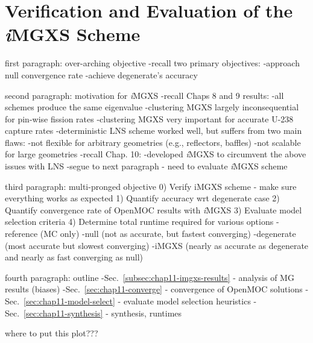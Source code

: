 \chapter{Verification and Evaluation of the \textit{i}MGXS Scheme}
\label{chap:results}

first paragraph: over-arching objective
-recall two primary objectives:
  -approach null convergence rate
  -achieve degenerate's accuracy

second paragraph: motivation for \textit{i}\ac{MGXS}
-recall Chaps 8 and 9 results:
  -all schemes produce the same eigenvalue
  -clustering MGXS largely inconsequential for pin-wise fission rates
  -clustering MGXS very important for accurate U-238 capture rates
  -deterministic LNS scheme worked well, but suffers from two main flaws:
    -not flexible for arbitrary geometries (e.g., reflectors, baffles)
    -not scalable for large geometries
-recall Chap. 10:
  -developed \textit{i}\ac{MGXS} to circumvent the above issues with LNS
-segue to next paragraph - need to evaluate \textit{i}\ac{MGXS} scheme

third paragraph: multi-pronged objective
0) Verify iMGXS scheme - make sure everything works as expected
1) Quantify accuracy wrt degenerate case
2) Quantify convergence rate of OpenMOC results with \textit{i}\ac{MGXS} 
3) Evaluate model selection criteria
4) Determine total runtime required for various options
   -reference (MC only)
   -null (not as accurate, but fastest converging)
   -degenerate (most accurate but slowest converging)
   -iMGXS (nearly as accurate as degenerate and nearly as fast converging as null)

fourth paragraph: outline
-Sec.~\ref{subsec:chap11-imgxs-results} - analysis of MG results (biases)
-Sec.~\ref{sec:chap11-converge} - convergence of OpenMOC solutions 
-Sec.~\ref{sec:chap11-model-select} - evaluate model selection heuristics
-Sec.~\ref{sec:chap11-synthesis} - synthesis, runtimes

where to put this plot???

